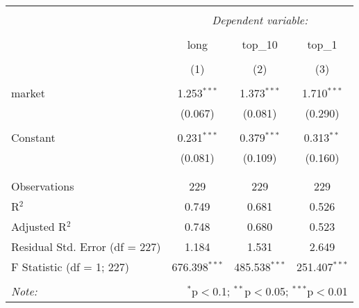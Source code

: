 
\begin{table}[!htbp] \centering 
  \caption{} 
  \label{} 
\begin{tabular}{@{\extracolsep{5pt}}lccc} 
\\[-1.8ex]\hline 
\hline \\[-1.8ex] 
 & \multicolumn{3}{c}{\textit{Dependent variable:}} \\ 
\cline{2-4} 
\\[-1.8ex] & long & top\_10 & top\_1 \\ 
\\[-1.8ex] & (1) & (2) & (3)\\ 
\hline \\[-1.8ex] 
 market & 1.253$^{***}$ & 1.373$^{***}$ & 1.710$^{***}$ \\ 
  & (0.067) & (0.081) & (0.290) \\ 
  & & & \\ 
 Constant & 0.231$^{***}$ & 0.379$^{***}$ & 0.313$^{**}$ \\ 
  & (0.081) & (0.109) & (0.160) \\ 
  & & & \\ 
\hline \\[-1.8ex] 
Observations & 229 & 229 & 229 \\ 
R$^{2}$ & 0.749 & 0.681 & 0.526 \\ 
Adjusted R$^{2}$ & 0.748 & 0.680 & 0.523 \\ 
Residual Std. Error (df = 227) & 1.184 & 1.531 & 2.649 \\ 
F Statistic (df = 1; 227) & 676.398$^{***}$ & 485.538$^{***}$ & 251.407$^{***}$ \\ 
\hline 
\hline \\[-1.8ex] 
\textit{Note:}  & \multicolumn{3}{r}{$^{*}$p$<$0.1; $^{**}$p$<$0.05; $^{***}$p$<$0.01} \\ 
\end{tabular} 
\end{table} 
